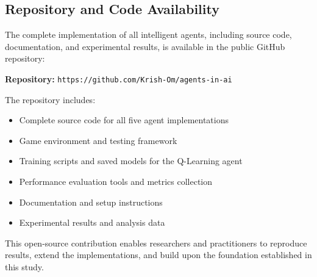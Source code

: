 \documentclass[11pt,a4paper]{article}
\begin{document}
\subsection{Repository and Code Availability}

The complete implementation of all intelligent agents, including source code, documentation, and experimental results, is available in the public GitHub repository:

\textbf{Repository:} \texttt{https://github.com/Krish-Om/agents-in-ai}

The repository includes:
\begin{itemize}
\item Complete source code for all five agent implementations
\item Game environment and testing framework
\item Training scripts and saved models for the Q-Learning agent
\item Performance evaluation tools and metrics collection
\item Documentation and setup instructions
\item Experimental results and analysis data
\end{itemize}

This open-source contribution enables researchers and practitioners to reproduce results, extend the implementations, and build upon the foundation established in this study.
\end{document}
